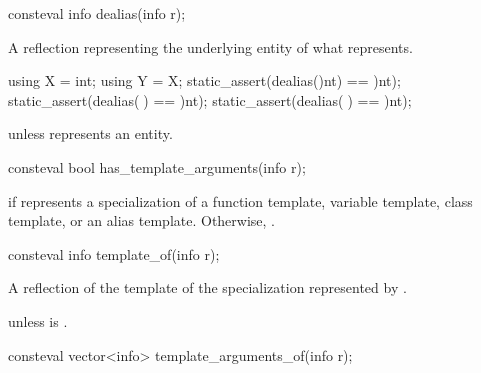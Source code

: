 %
\begin{itemdecl}
consteval info dealias(info r);
\end{itemdecl}

\begin{itemdescr}
\pnum
\returns
A reflection representing the underlying entity of what  represents.
\begin{example}
\begin{codeblock}
using X = int;
using Y = X;
static_assert(dealias(^^int) == ^^int);
static_assert(dealias(^^X) == ^^int);
static_assert(dealias(^^Y) == ^^int);
\end{codeblock}
\end{example}

\pnum
\throws
{} unless
 represents an entity.
\end{itemdescr}

%
\begin{itemdecl}
consteval bool has_template_arguments(info r);
\end{itemdecl}

\begin{itemdescr}
\pnum
\returns
{} if  represents a specialization of a
function template,
variable template,
class template, or
an alias template.
Otherwise, .
\end{itemdescr}

%
\begin{itemdecl}
consteval info template_of(info r);
\end{itemdecl}

\begin{itemdescr}
\pnum
\returns
A reflection of the template of the specialization represented by .

\pnum
\throws
{} unless
 is .
\end{itemdescr}

%
\begin{itemdecl}
consteval vector<info> template_arguments_of(info r);
\end{itemdecl}

